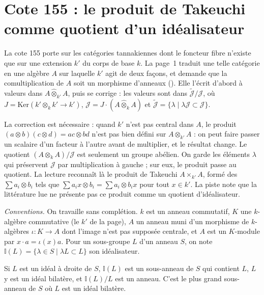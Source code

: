 \section[Cote 155 : le produit de Takeuchi comme quotient d'un idéalisateur]{Cote 155 : le produit de Takeuchi comme quotient d'un idéalisateur\protect{}}\label{sec:155}

La cote 155 porte sur les catégories tannakiennes dont le foncteur fibre n'existe que sur une extension $k'$ du corps de base $k$. La page~1 traduit une telle catégorie en une algèbre $A$ sur laquelle $k'$ agit de deux façons, et demande que la comultiplication de $A$ soit un morphisme d'anneaux (). Elle l'écrit d'abord à valeurs dans $A \mathbin{\hat\otimes}_{k'} A$, puis se corrige : les valeurs sont dans $\tilde{\mathcal J}/\mathcal J$, où $J = \mathrm{Ker}(k' \otimes_k k' \to k')$, $\mathcal J = J \cdot (A \mathbin{\hat\otimes}_k A)$ et $\tilde{\mathcal J} = \{\lambda \mid \lambda\mathcal J \subset \mathcal J\}$.

La correction est nécessaire : quand $k'$ n'est pas central dans $A$, le produit $(a \otimes b)(c \otimes d) = ac \otimes bd$ n'est pas bien défini sur $A \otimes_{k'} A$ : on peut faire passer un scalaire d'un facteur à l'autre avant de multiplier, et le résultat change. Le quotient $(A \otimes_k A)/\mathcal J$ est seulement un groupe abélien. On garde les éléments $\lambda$ qui préservent $\mathcal J$ par multiplication à gauche ; sur eux, le produit passe au quotient. La lecture reconnaît là le produit de Takeuchi $A \times_{k'} A$, formé des $\sum a_i \otimes b_i$ tels que $\sum a_i x \otimes b_i = \sum a_i \otimes b_i x$ pour tout $x \in k'$. La piste note que la littérature lue ne présente pas ce produit comme un quotient d'idéalisateur.

\noindent\emph{Conventions.} On travaille sans complétion. $k$ est un anneau commutatif, $K$ une $k$-algèbre commutative (le $k'$ de la page), $A$ un anneau muni d'un morphisme de $k$-algèbres $\iota : K \to A$ dont l'image n'est pas supposée centrale, et $A$ est un $K$-module par $x \cdot a = \iota(x)a$. Pour un sous-groupe $L$ d'un anneau $S$, on note $\mathbb I(L) = \{\lambda \in S \mid \lambda L \subset L\}$ son idéalisateur.

\begin{enonce}
Si $L$ est un idéal à droite de $S$, $\mathbb I(L)$ est un sous-anneau de $S$ qui contient $L$, $L$ y est un idéal bilatère, et $\mathbb I(L)/L$ est un anneau. C'est le plus grand sous-anneau de $S$ où $L$ est un idéal bilatère.
\end{enonce}

